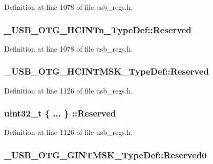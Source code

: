 Definition at line 1078 of file usb\-\_\-regs.\-h.

\hypertarget{group___u_s_b___o_t_g___d_r_i_v_e_r_ga1eeb2f9bd4676b6bd548c4ef0114ebc8}{
\subsubsection[{Reserved}]{ \-\_\-\-U\-S\-B\-\_\-\-O\-T\-G\-\_\-\-H\-C\-I\-N\-Tn\-\_\-\-Type\-Def\-::\-Reserved}}\label{group___u_s_b___o_t_g___d_r_i_v_e_r_ga1eeb2f9bd4676b6bd548c4ef0114ebc8}


Definition at line 1078 of file usb\-\_\-regs.\-h.

\hypertarget{group___u_s_b___o_t_g___d_r_i_v_e_r_ga561314bd51b64e6b9f40b34dc8944e0b}{
\subsubsection[{Reserved}]{ \-\_\-\-U\-S\-B\-\_\-\-O\-T\-G\-\_\-\-H\-C\-I\-N\-T\-M\-S\-K\-\_\-\-Type\-Def\-::\-Reserved}}\label{group___u_s_b___o_t_g___d_r_i_v_e_r_ga561314bd51b64e6b9f40b34dc8944e0b}


Definition at line 1126 of file usb\-\_\-regs.\-h.

\hypertarget{group___u_s_b___o_t_g___d_r_i_v_e_r_ga148e67a3d9730822204847515b78770a}{
\subsubsection[{Reserved}]{\setlength{\rightskip}{0pt plus 5cm}uint32\-\_\-t \{ ... \} \-::Reserved}}\label{group___u_s_b___o_t_g___d_r_i_v_e_r_ga148e67a3d9730822204847515b78770a}


Definition at line 1126 of file usb\-\_\-regs.\-h.

\hypertarget{group___u_s_b___o_t_g___d_r_i_v_e_r_gae70b4c3c3e4cd67e47bffb922442b1d1}{
\subsubsection[{Reserved0}]{ \-\_\-\-U\-S\-B\-\_\-\-O\-T\-G\-\_\-\-G\-I\-N\-T\-M\-S\-K\-\_\-\-Type\-Def\-::\-Reserved0}}\label{group___u_s_b___o_t_g___d_r_i_v_e_r_gae70b4c3c3e4cd67e47bffb922442b1d1}


